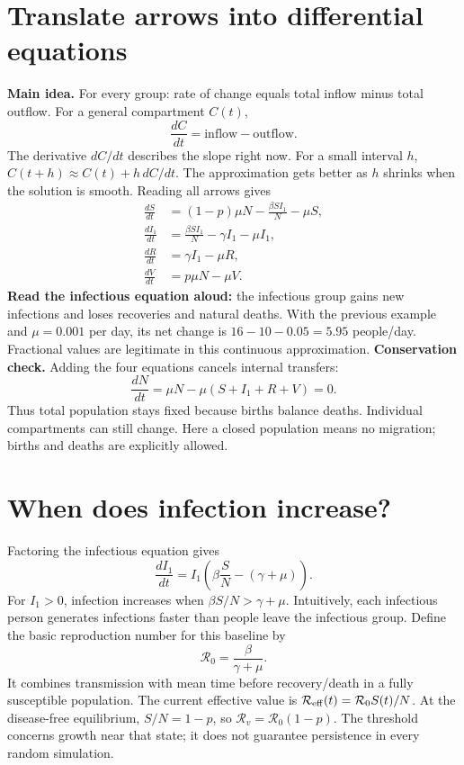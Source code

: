 \documentclass[11pt]{article}
\newcommand{\idea}[1]{\textbf{Main idea.} #1}
\begin{document}
\section{Translate arrows into differential equations}
\idea{For every group: rate of change equals total inflow minus total outflow.}
For a general compartment $C(t)$,
\[
\frac{dC}{dt}=\text{inflow}-\text{outflow}.
\]
The derivative $dC/dt$ describes the slope right now. For a small interval $h$,
$C(t+h)\approx C(t)+h\,dC/dt$. The approximation gets better as $h$ shrinks when the solution is smooth.
Reading all arrows gives
\begin{align*}
\frac{dS}{dt}&=(1-p)\mu N-\frac{\beta SI_1}{N}-\mu S,\\
\frac{dI_1}{dt}&=\frac{\beta SI_1}{N}-\gamma I_1-\mu I_1,\\
\frac{dR}{dt}&=\gamma I_1-\mu R,\\
\frac{dV}{dt}&=p\mu N-\mu V.
\end{align*}
\textbf{Read the infectious equation aloud:} the infectious group gains new infections and loses recoveries and natural deaths. With the previous example and $\mu=0.001$ per day, its net change is $16-10-0.05=5.95$ people/day. Fractional values are legitimate in this continuous approximation.
\textbf{Conservation check.} Adding the four equations cancels internal transfers:
\[
\frac{dN}{dt}=\mu N-\mu(S+I_1+R+V)=0.
\]
Thus total population stays fixed because births balance deaths. Individual compartments can still change. Here a closed population means no migration; births and deaths are explicitly allowed.
\section{When does infection increase?}
Factoring the infectious equation gives
\[
\frac{dI_1}{dt}=I_1\left(\beta\frac{S}{N}-(\gamma+\mu)\right).
\]
For $I_1>0$, infection increases when $\beta S/N>\gamma+\mu$. Intuitively, each infectious person generates infections faster than people leave the infectious group.
Define the basic reproduction number for this baseline by
\[
\mathcal R_0=\frac{\beta}{\gamma+\mu}.
\]
It combines transmission with mean time before recovery/death in a fully susceptible population. The current effective value is $\mathcal R_{\rm eff}(t)=\mathcal R_0 S(t)/N$. At the disease-free equilibrium, $S/N=1-p$, so $\mathcal R_v=\mathcal R_0(1-p)$. The threshold concerns growth near that state; it does not guarantee persistence in every random simulation.
\newpage
\end{document}
